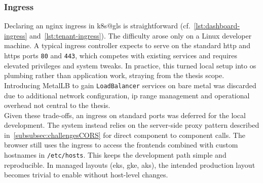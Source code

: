 \documentclass[11pt, a4paper, oneside, listof=totoc]{scrartcl}
\begin{document}
            \subsubsection{Ingress}\label{subsubsec:ingress}
                Declaring an nginx ingress in \gls{k8s@gls} is straightforward
                (cf.~\autoref{lst:dashboard-ingress} and~\autoref{lst:tenant-ingress}).
                The difficulty arose only on a Linux developer machine.
                A typical ingress controller expects to serve on the standard \gls{http} and
                \gls{https} ports \texttt{80} and \texttt{443}, which competes with existing services
                and requires elevated privileges and system tweaks.
                In practice, this turned local setup into \gls{os} plumbing rather than application
                work, straying from the thesis scope.\\
                Introducing MetalLB to gain \texttt{LoadBalancer} services on bare metal was
                discarded due to additional network configuration, \gls{ip} range management and
                operational overhead not central to the thesis.\\
                Given these trade-offs, an ingress on standard ports was deferred for the local
                development.
                The system instead relies on the server-side proxy pattern described
                in~\autoref{subsubsec:challengesCORS} for direct component to component calls.
                The browser still uses the ingress to access the frontends combined with custom
                hostnames in \texttt{/etc/hosts}.
                This keeps the development path simple and reproducible.
                In managed layouts (\gls{eks}, \gls{gke}, \gls{aks}), the intended production
                layout becomes trivial to enable without host-level changes.
\end{document}
